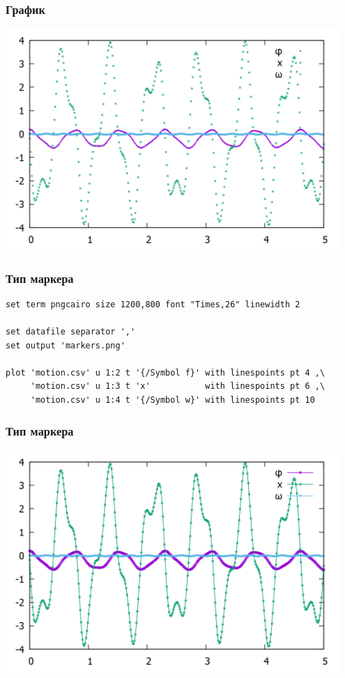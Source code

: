 \documentclass[12pt, compress]{beamer}
\begin{document}
\begin{frame}[t]
\frametitle{График}
\includegraphics[width=0.95\textwidth]{./gp/default_data.png}
\end{frame}


\begin{frame}[c,fragile]
\frametitle{Тип маркера}
\begin{lstlisting}[basicstyle={\scriptsize}]
set term pngcairo size 1200,800 font "Times,26" linewidth 2

set datafile separator ','
set output 'markers.png'

plot 'motion.csv' u 1:2 t '{/Symbol f}' with linespoints pt 4 ,\
     'motion.csv' u 1:3 t 'x'           with linespoints pt 6 ,\
     'motion.csv' u 1:4 t '{/Symbol w}' with linespoints pt 10
\end{lstlisting}
\end{frame}

\begin{frame}[t,fragile]
\frametitle{Тип маркера}
\includegraphics[width=0.95\textwidth]{./gp/markers.png}
\end{frame}
\end{document}
